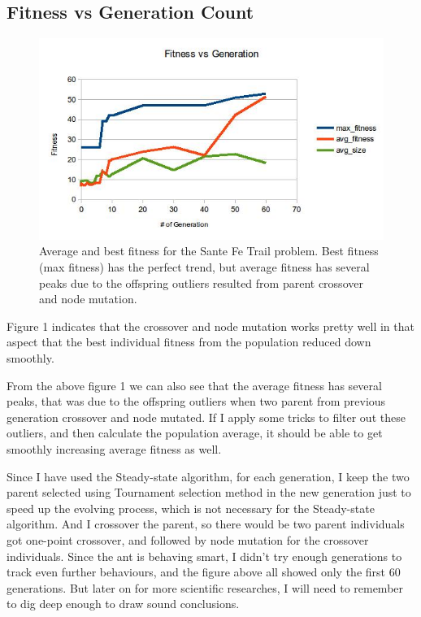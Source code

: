 \documentclass[10pt,b5paper]{article}
\begin{document}
\subsection{Fitness vs Generation Count}
\label{sec-2-1}
\begin{figure}[htb]
\centering
\includegraphics[width=.9\linewidth]{./fig1.jpg}
\caption{Average and best fitness for the Sante Fe Trail problem. Best fitness (max fitness) has the perfect trend, but average fitness has several peaks due to the offspring outliers resulted from parent crossover and node mutation.}
\end{figure}
Figure 1 indicates that the crossover and node mutation works pretty well in that aspect that the best individual fitness from the population reduced down smoothly. 

From the above figure 1 we can also see that the average fitness has several peaks, that was due to the offspring outliers when two parent from previous generation crossover and node mutated. If I apply some tricks to filter out these outliers, and then calculate the population average, it should be able to get smoothly increasing average fitness as well.

Since I have used the Steady-state algorithm, for each generation, I keep the two parent selected using Tournament selection method in the new generation just to speed up the evolving process, which is not necessary for the Steady-state algorithm. And I crossover the parent, so there would be two parent individuals got one-point crossover, and followed by node mutation for the crossover individuals. Since the ant is behaving smart, I didn't try enough generations to track even further behaviours, and the figure above all showed only the first 60 generations. But later on for more scientific researches, I will need to remember to dig deep enough to draw sound conclusions.
\end{document}
